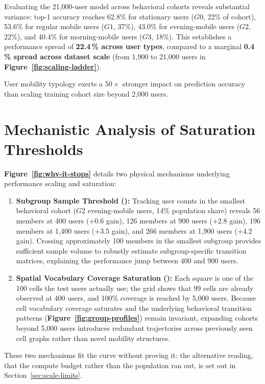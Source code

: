 Evaluating the 21,000-user model across behavioral cohorts reveals substantial variance: top-1 accuracy reaches 62.8\% for stationary users ($G0$, 22\% of cohort), 53.6\% for regular mobile users ($G1$, 37\%), 43.0\% for evening-mobile users ($G2$, 22\%), and 40.4\% for morning-mobile users ($G3$, 18\%). This establishes a performance spread of \textbf{22.4\,\% across user types}, compared to a marginal \textbf{0.4\,\% spread across dataset scale} (from 1,900 to 21,000 users in \textbf{Figure~\ref{fig:scaling-ladder}}).

User mobility typology exerts a $50\times$ stronger impact on prediction accuracy than scaling training cohort size beyond 2,000 users.

\section{Mechanistic Analysis of Saturation Thresholds}

\textbf{Figure~\ref{fig:why-it-stops}} details two physical mechanisms underlying performance scaling and saturation:
\begin{enumerate}
    \item \textbf{Subgroup Sample Threshold ():} Tracking user counts in the smallest behavioral cohort ($G2$ evening-mobile users, 14\% population share) reveals 56 members at 400 users (+0.6\pt{} gain), 126 members at 900 users (+2.8\pt{} gain), 196 members at 1,400 users (+3.5\pt{} gain), and 266 members at 1,900 users (+4.2\pt{} gain). Crossing approximately 100 members in the smallest subgroup provides sufficient sample volume to robustly estimate subgroup-specific transition matrices, explaining the performance jump between 400 and 900 users.
    \item \textbf{Spatial Vocabulary Coverage Saturation ():} Each square is one of the 100 cells the test users actually use; the grid shows that 99 cells are already observed at 400 users, and 100\% coverage is reached by 5,000 users. Because cell vocabulary coverage saturates and the underlying behavioral transition patterns (\textbf{Figure~\ref{fig:group-profiles}}) remain invariant, expanding cohorts beyond 5,000 users introduces redundant trajectories across previously seen cell graphs rather than novel mobility structures.
\end{enumerate}



These two mechanisms fit the curve without proving it: the alternative reading, that the compute budget rather than the population ran out, is set out in Section~\ref{sec:scale-limits}.

